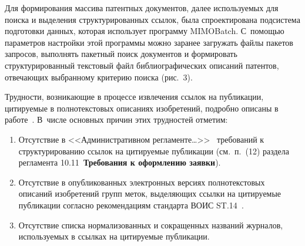 \begin{multicols}{2}
      Для формирования массива патентных документов, далее используемых для поиска и 
выделения структурированных ссылок, была спроектирована подсистема подготовки данных, 
которая использует программу MIMOBatch. С~помощью параметров настройки этой 
программы можно заранее загружать файлы пакетов запросов, выполнять пакетный поиск 
документов и формировать структурированный текстовый файл библиографических описаний 
патентов, отвечающих выбранному критерию поиска (рис.~3).


      
      Трудности, возникающие в процессе извлечения ссылок на публикации, цитируемые в 
полнотекстовых описаниях изобретений, подробно описаны в работе~\cite{16-zac}. В~числе 
основных причин этих трудностей отметим:\\[-14pt]
      \begin{enumerate}[1.]
\item Отсутствие в <<Административном регламенте\ldots>>~\cite{21-zac} требований к 
структурированию ссылок на цитируемые публикации (см.\ п.~(12) раздела регламента 
10.11~\textbf{Требования к оформлению заявки}).\\[-14pt]
\item Отсутствие в опубликованных электронных версиях полнотекстовых описаний 
изобретений групп меток, выделяющих ссылки на цитируемые публикации согласно 
рекомендациям стандарта ВОИС ST.14~\cite{22-zac}.\\[-14pt]
\item Отсутствие списка нормализованных и сокращенных названий журналов, 
используемых в ссылках на цитируемые публикации.
      \end{enumerate}
      

\end{multicols}
